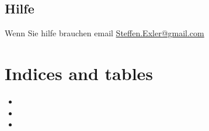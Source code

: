\documentclass[letterpaper,10pt,ngerman]{sphinxmanual}
\begin{document}
\section{Hilfe}
\label{help:hilfe}\label{help::doc}
Wenn Sie hilfe brauchen email \href{mailto:Steffen.Exler@gmail.com}{Steffen.Exler@gmail.com}


\chapter{Indices and tables}
\label{index:indices-and-tables}\begin{itemize}
\item {} 

\item {} 

\item {} 

\end{itemize}



\renewcommand{\indexname}{Stichwortverzeichnis}
\printindex
\end{document}
